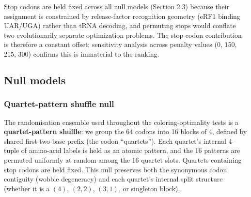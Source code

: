\documentclass[preprint,11pt,authoryear,a4paper]{elsarticle}
\begin{document}
Stop codons are held fixed across all null models (Section 2.3) because
their assignment is constrained by release-factor recognition geometry
(eRF1 binding UAR/UGA) rather than tRNA decoding, and permuting stops
would conflate two evolutionarily separate optimization problems. The
stop-codon contribution is therefore a constant offset; sensitivity
analysis across penalty values (0, 150, 215, 300) confirms this is
immaterial to the ranking.

\subsection{Null models}\label{sec:nullmodels}

\subsubsection{Quartet-pattern shuffle null}\label{sec:null-fh}

The randomisation ensemble used throughout the coloring-optimality tests
is a \textbf{quartet-pattern shuffle}: we group the 64 codons into 16
blocks of 4, defined by shared first-two-base prefix (the codon
``quartets''). Each quartet's internal 4-tuple of amino-acid labels is
held as an atomic pattern, and the 16 patterns are permuted uniformly at
random among the 16 quartet slots. Quartets containing stop codons are
held fixed. This null preserves both the synonymous codon contiguity
(wobble degeneracy) and each quartet's internal split structure (whether
it is a \((4)\), \((2,2)\), \((3,1)\), or singleton block).
\end{document}
